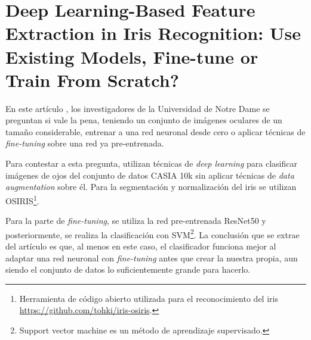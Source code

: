 




\section{Deep Learning-Based Feature Extraction in Iris Recognition: Use Existing Models, Fine-tune or Train From Scratch?}


En este artículo \cite{boyd_deep_2020}, los investigadores de la Universidad de Notre Dame se preguntan si vale la pena, teniendo un conjunto de imágenes oculares de un tamaño considerable,
entrenar a una red neuronal desde cero o aplicar técnicas de \textit{fine-tuning} sobre una red ya pre-entrenada.

Para contestar a esta pregunta, utilizan técnicas de \textit{deep learning} para clasificar imágenes de ojos del conjunto de datos CASIA 10k sin aplicar técnicas de \textit{data augmentation} sobre él. 
Para la segmentación y normalización del iris se utilizan OSIRIS\footnote{Herramienta de código abierto utilizada para el reconocimiento del iris \url{https://github.com/tohki/iris-osiris}.}.

Para la parte de \textit{fine-tuning}, se utiliza la red pre-entrenada ResNet50 y posteriormente, se realiza la clasificación con SVM\footnote{Support vector machine es un método de aprendizaje supervisado.}.
La conclusión que se extrae del artículo es que, al menos en este caso, el clasificador funciona mejor al adaptar una red neuronal con \textit{fine-tuning} antes que crear la nuestra propia, aun siendo el 
conjunto de datos lo suficientemente grande para hacerlo.
